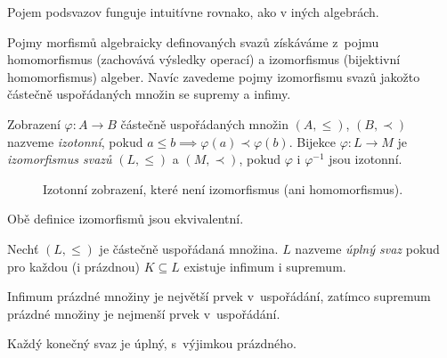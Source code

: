 Pojem podsvazov funguje intuitívne rovnako, ako v iných algebrách.

Pojmy morfismů algebraicky definovaných svazů získáváme
z~pojmu homomorfismus (zachovává výsledky operací)
a izomorfismus (bijektivní homomorfismus) algeber. Navíc zavedeme pojmy
izomorfismu svazů jakožto částečně uspořádaných množin se supremy a infimy.

\begin{definition}
    Zobrazení $\varphi : A \to B$ částečně uspořádaných množin
    $(A, \leq)$, $(B, \prec)$ nazveme {\em izotonní},
    pokud $a \leq b \implies \varphi(a) \prec \varphi(b)$.
    Bijekce $\varphi : L \to M$ je {\em izomorfismus svazů}
    $(L, \leq)$ a $(M, \prec)$, pokud $\varphi$ i $\varphi^{-1}$ jsou
    izotonní.
\end{definition}

\begin{figure}[h!]
\centering
{}
\caption{Izotonní zobrazení, které není izomorfismus (ani homomorfismus).}
\end{figure}

\begin{claim}
    Obě definice izomorfismů jsou ekvivalentní.
\end{claim}

\begin{definition}
    Nechť $(L, \leq)$ je částečně uspořádaná množina.
    $L$ nazveme {\em úplný svaz} pokud pro každou (i prázdnou)
    $K \subseteq L$ existuje infimum i supremum.
\end{definition}

Infimum prázdné množiny je největší prvek v~uspořádání,
zatímco supremum prázdné množiny je nejmenší prvek v~uspořádání.

\begin{note}
    Každý konečný svaz je úplný, s~výjimkou prázdného.
\end{note}

